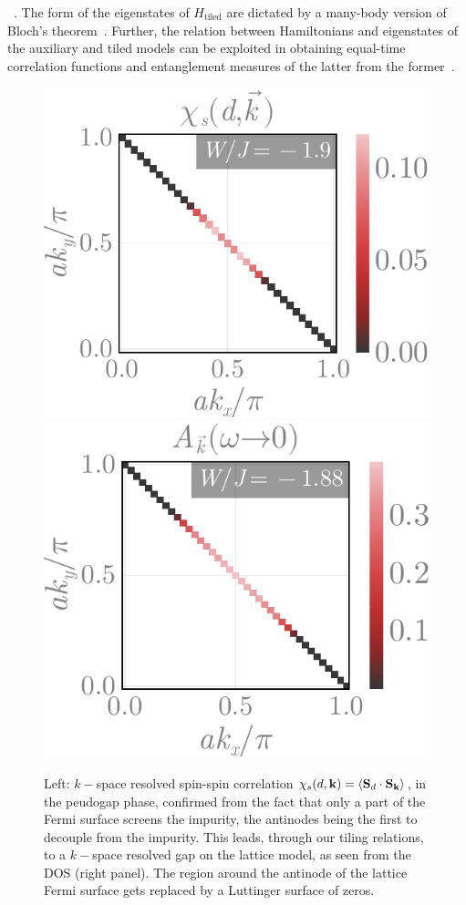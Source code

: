 \documentclass[%
 reprint,
superscriptaddress,
groupedaddress,
 amsmath,amssymb,
 aps,
prl
]{revtex4-2}
\begin{document}
~\cite{suppmat}. 
The form of the eigenstates of $H_{\text{tiled}}$
are dictated by a many-body version of Bloch's theorem~\cite{stoyanova}. Further, the relation between Hamiltonians and eigenstates of the auxiliary and tiled models can be exploited in obtaining equal-time correlation functions and
entanglement measures of the latter from the former~\cite{suppmat}.
\begin{figure}
    \centering
    \includegraphics[width=0.49\linewidth]{SF-3.pdf}
    \includegraphics[width=0.49\linewidth]{kspaceDOS-3.pdf}
    \caption{Left: $k-$space resolved spin-spin correlation $\chi_s(d,{\bf k}) = \braket{{\bf S}_d\cdot{\bf S}_{\bf k}}$, in the peudogap phase, confirmed from the fact that only a part of the Fermi surface screens the impurity, the antinodes being the first to decouple from the impurity. This leads, through our tiling relations, to a $k-$space resolved gap on the lattice model, as seen from the DOS (right panel). The region around the antinode of the lattice Fermi surface gets replaced by a Luttinger surface of zeros.}
    \label{spinCorr}
\end{figure}
\end{document}
